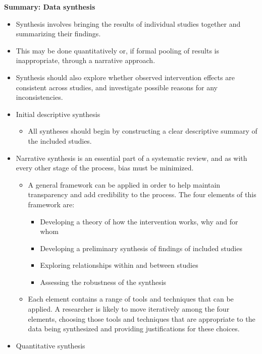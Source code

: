 \documentclass[
  10pt,
  a4paper,
  DIV=11,
  numbers=noendperiod]{scrreprt}
\providecommand{\tightlist}{%
  \setlength{\itemsep}{0pt}\setlength{\parskip}{0pt}}
\begin{document}
\textbf{Summary: Data synthesis}

\begin{itemize}
\item
  Synthesis involves bringing the results of individual studies together
  and summarizing their findings.
\item
  This may be done quantitatively or, if formal pooling of results is
  inappropriate, through a narrative approach.
\item
  Synthesis should also explore whether observed intervention effects
  are consistent across studies, and investigate possible reasons for
  any inconsistencies.
\item
  Initial descriptive synthesis

  \begin{itemize}
  \tightlist
  \item
    All syntheses should begin by constructing a clear descriptive
    summary of the included studies.
  \end{itemize}
\item
  Narrative synthesis is an essential part of a systematic review, and
  as with every other stage of the process, bias must be minimized.

  \begin{itemize}
  \item
    A general framework can be applied in order to help maintain
    transparency and add credibility to the process. The four elements
    of this framework are:

    \begin{itemize}
    \item
      Developing a theory of how the intervention works, why and for
      whom
    \item
      Developing a preliminary synthesis of findings of included studies
    \item
      Exploring relationships within and between studies
    \item
      Assessing the robustness of the synthesis
    \end{itemize}
  \item
    Each element contains a range of tools and techniques that can be
    applied. A researcher is likely to move iteratively among the four
    elements, choosing those tools and techniques that are appropriate
    to the data being synthesized and providing justifications for these
    choices.
  \end{itemize}
\item
  Quantitative synthesis


\end{itemize}
\end{document}
